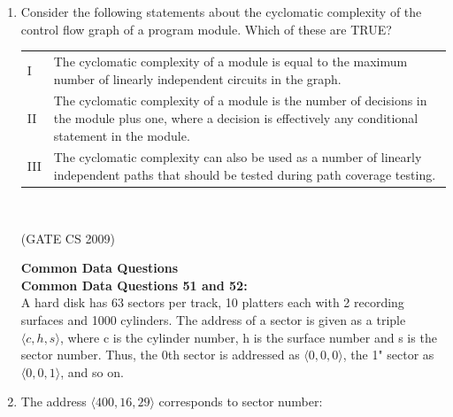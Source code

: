 \documentclass[a4paper, 11pt]{article}
\begin{document}
\begin{enumerate}
    \item Consider the following statements about the cyclomatic complexity of the control flow graph of a program module. Which of these are TRUE?\\
    \begin{tabular}{ll}
        I & The cyclomatic complexity of a module is equal to the maximum number of linearly independent circuits in the graph. \\
        II & The cyclomatic complexity of a module is the number of decisions in the module plus one, where a decision is effectively any conditional statement in the module.\\
        III & The cyclomatic complexity can also be used as a number of linearly independent paths that should be tested during path coverage testing.\\
    \end{tabular}\\
    \begin{enumerate}
    \end{enumerate}
    
    
    \hfill (GATE CS 2009)

    \textbf{{\LARGE Common Data Questions}} \\
    \textbf{\big Common Data Questions 51 and 52:} \\
    A hard disk has 63 sectors per track, 10 platters each with 2 recording surfaces and 1000 cylinders. The address of a sector is given as a triple $\langle c,h,s \rangle$, where c is the cylinder number, h is the surface number and s is the sector number. Thus, the 0th sector is addressed as $\langle 0,0,0 \rangle$, the 1" sector as $\langle 0,0,1 \rangle $, and so on.
    \item The address $\langle 400,16,29 \rangle$ corresponds to sector number:\\
    \begin{enumerate}
    \end{enumerate}
    

\end{enumerate}
\end{document}
